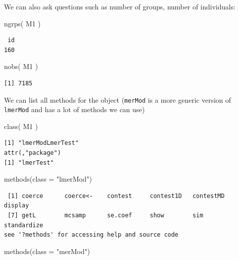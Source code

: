 \documentclass[
  letterpaper,
  DIV=11,
  numbers=noendperiod]{scrreprt}
\newenvironment{Shaded}{}{}
\newcommand{\AttributeTok}[1]{\textcolor[rgb]{0.49,0.56,0.16}{#1}}
\newcommand{\FunctionTok}[1]{\textcolor[rgb]{0.02,0.16,0.49}{#1}}
\newcommand{\NormalTok}[1]{#1}
\newcommand{\StringTok}[1]{\textcolor[rgb]{0.25,0.44,0.63}{#1}}
\begin{document}
We can also ask questions such as number of groups, number of
individuals:

\begin{Shaded}
\begin{Highlighting}[]
\FunctionTok{ngrps}\NormalTok{( M1 )}
\end{Highlighting}
\end{Shaded}

\begin{verbatim}
 id 
160 
\end{verbatim}

\begin{Shaded}
\begin{Highlighting}[]
\FunctionTok{nobs}\NormalTok{( M1 )}
\end{Highlighting}
\end{Shaded}

\begin{verbatim}
[1] 7185
\end{verbatim}

We can list all methods for the object (\texttt{merMod} is a more
generic version of \texttt{lmerMod} and has a lot of methods we can use)

\begin{Shaded}
\begin{Highlighting}[]
\FunctionTok{class}\NormalTok{( M1 )}
\end{Highlighting}
\end{Shaded}

\begin{verbatim}
[1] "lmerModLmerTest"
attr(,"package")
[1] "lmerTest"
\end{verbatim}

\begin{Shaded}
\begin{Highlighting}[]
\FunctionTok{methods}\NormalTok{(}\AttributeTok{class =} \StringTok{"lmerMod"}\NormalTok{)}
\end{Highlighting}
\end{Shaded}

\begin{verbatim}
 [1] coerce      coerce<-    contest     contest1D   contestMD   display    
 [7] getL        mcsamp      se.coef     show        sim         standardize
see '?methods' for accessing help and source code
\end{verbatim}

\begin{Shaded}
\begin{Highlighting}[]
\FunctionTok{methods}\NormalTok{(}\AttributeTok{class =} \StringTok{"merMod"}\NormalTok{)}
\end{Highlighting}
\end{Shaded}
\end{document}
